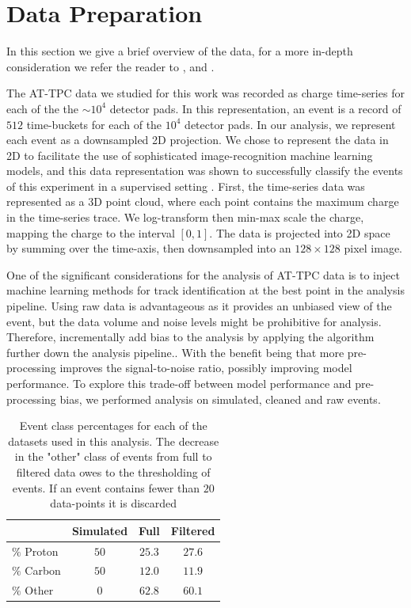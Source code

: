 \documentclass[review,number,sort&compress]{elsarticle}
\begin{document}
\section{Data Preparation}

In this section we give a brief overview of the data, for a more in-depth consideration we refer the reader to \cite{Mittig2015}, \cite{Suzuki2012} and  \cite{Bradt2017a}. 

The AT-TPC data we studied for this work was recorded as charge time-series for each of the  the $\sim10^4$ detector pads.
In this representation, an event is a record of $512$ time-buckets for each of the $10^4$ detector pads. In our analysis, we represent each event as a downsampled 2D projection.
We chose to represent the data in 2D to facilitate the use of sophisticated image-recognition machine learning models, and this data representation was shown to successfully classify the events of this experiment in a supervised setting \cite{Kuchera2019}.
First, the time-series data was represented as a 3D point cloud, where each point contains the maximum charge in the time-series trace. We log-transform then min-max scale the charge, mapping the charge to the interval $[0, 1]$. The data is projected into 2D space by summing over the time-axis, then downsampled into an $128\times128$ pixel image.

One of the significant considerations for the analysis of AT-TPC data is to inject machine learning methods for track identification at the best point in the analysis pipeline.
Using raw data is advantageous as it provides an unbiased view of the event, but the data volume and noise levels might be prohibitive for analysis.
Therefore, incrementally add bias to the analysis by applying the algorithm further down the analysis pipeline.. With the benefit being that more pre-processing improves the signal-to-noise ratio, possibly improving model performance.
To explore this trade-off between model performance and pre-processing bias, we performed analysis on simulated, cleaned and raw events.

\begin{table}
\centering
\caption{Event class percentages for each of the datasets used in this analysis. The decrease in the "other" class of events from full to filtered data owes to the thresholding of events. If an event contains fewer than $20$ data-points it is discarded }\label{tab:class_distr}
\begin{tabular}{lccc}
\toprule
{} & Simulated & Full & Filtered \\
\midrule
$\%$ Proton & $50$ & $25.3$ & $27.6$ \\ 
$\%$ Carbon & $50$ & $12.0$ & $11.9$ \\
$\%$ Other & $0$ & $62.8$ & $60.1$ \\
\end{tabular}
\end{table}
\end{document}
